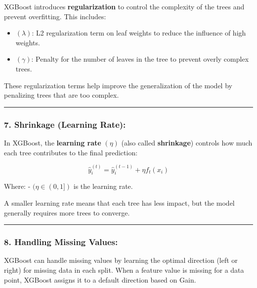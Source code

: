 \documentclass[12pt]{book}
\providecommand{\tightlist}{%
  \setlength{\itemsep}{0pt}\setlength{\parskip}{0pt}}
\begin{document}
XGBoost introduces \textbf{regularization} to control the complexity of
the trees and prevent overfitting. This includes:

\begin{itemize}
\tightlist
\item
  \textbf{\(( \lambda )\)}: L2 regularization term on leaf weights to
  reduce the influence of high weights.
\item
  \textbf{\(( \gamma )\)}: Penalty for the number of leaves in the tree
  to prevent overly complex trees.
\end{itemize}

These regularization terms help improve the generalization of the model
by penalizing trees that are too complex.

\begin{center}\rule{0.5\linewidth}{0.5pt}\end{center}

\subsubsection{\texorpdfstring{7. \textbf{Shrinkage (Learning
Rate):}}{7. Shrinkage (Learning Rate):}}\label{shrinkage-learning-rate}

In XGBoost, the \textbf{learning rate} \(( \eta )\) (also called
\textbf{shrinkage}) controls how much each tree contributes to the final
prediction:

\[
\hat{y}_i^{(t)} = \hat{y}_i^{(t-1)} + \eta f_t(x_i)
\]

Where: - \(( \eta \in (0, 1] )\) is the learning rate.

A smaller learning rate means that each tree has less impact, but the
model generally requires more trees to converge.

\begin{center}\rule{0.5\linewidth}{0.5pt}\end{center}

\subsubsection{\texorpdfstring{8. \textbf{Handling Missing
Values:}}{8. Handling Missing Values:}}\label{handling-missing-values}

XGBoost can handle missing values by learning the optimal direction
(left or right) for missing data in each split. When a feature value is
missing for a data point, XGBoost assigns it to a default direction
based on Gain.
\end{document}
